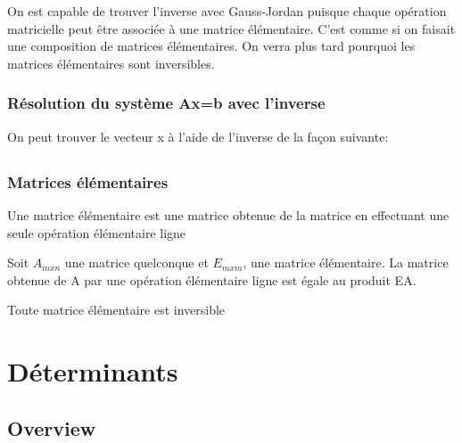 \documentclass{article}
\begin{document}
\begin{intuition}
    On est capable de trouver l'inverse avec Gauss-Jordan puisque chaque
    opération matricielle peut être associée à une matrice élémentaire.
    C'est comme si on faisait une composition de matrices élémentaires.
    On verra plus tard pourquoi les matrices élémentaires sont inversibles.
\end{intuition}

\subsubsection{Résolution du système Ax=b avec l'inverse}

On peut trouver le vecteur x à l'aide de l'inverse de la façon suivante:
\begin{multline}
\end{multline}

\subsubsection{Matrices élémentaires}

\begin{definition}
    Une matrice élémentaire est une matrice obtenue de la matrice en
    effectuant une seule opération élémentaire ligne
\end{definition}

\begin{proposition}
    Soit $A_{mxn}$ une matrice quelconque et $E_{mxm}$, une matrice
    élémentaire. La matrice obtenue de A par une opération élémentaire
    ligne est égale au produit EA.
\end{proposition}

\begin{proposition}
    Toute matrice élémentaire est inversible
\end{proposition}

\pagebreak
\section{Déterminants}
\subsection{Overview}
\end{document}
